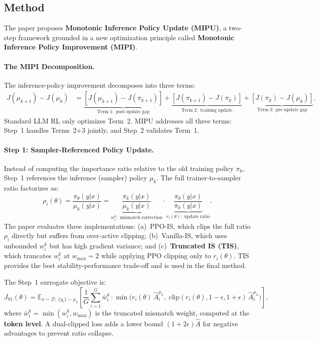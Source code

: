 \documentclass[11pt,a4paper]{article}
\begin{document}
\subsection{Method}

The paper proposes \textbf{Monotonic Inference Policy Update (MIPU)}, a two-step framework grounded in a new optimization principle called \textbf{Monotonic Inference Policy Improvement (MIPI)}.

\paragraph{The MIPI Decomposition.} The inference-policy improvement decomposes into three terms:
\begin{align}
J(\mu_{k+1}) - J(\mu_k) &= \underbrace{[J(\mu_{k+1}) - J(\pi_{k+1})]}_{\mathrm{Term\;1:\;post\text{-}update\;gap}} + \underbrace{[J(\pi_{k+1}) - J(\pi_k)]}_{\mathrm{Term\;2:\;training\;update}} + \underbrace{[J(\pi_k) - J(\mu_k)]}_{\mathrm{Term\;3:\;pre\text{-}update\;gap}}.
\end{align}
Standard LLM RL only optimizes Term~2. MIPU addresses all three terms: Step~1 handles Terms~2+3 jointly, and Step~2 validates Term~1.

\paragraph{Step 1: Sampler-Referenced Policy Update.} Instead of computing the importance ratio relative to the old training policy $\pi_k$, Step~1 references the inference (sampler) policy $\mu_k$. The full trainer-to-sampler ratio factorizes as:
\[
\rho_i(\theta) = \frac{\pi_\theta(y|x)}{\mu_k(y|x)} = \underbrace{\frac{\pi_k(y|x)}{\mu_k(y|x)}}_{w_i^k:\;\mathrm{mismatch\;correction}} \cdot \underbrace{\frac{\pi_\theta(y|x)}{\pi_k(y|x)}}_{r_i(\theta):\;\mathrm{update\;ratio}}.
\]
The paper evaluates three implementations: (a)~PPO-IS, which clips the full ratio $\rho_i$ directly but suffers from over-active clipping; (b)~Vanilla-IS, which uses unbounded $w_i^k$ but has high gradient variance; and (c)~\textbf{Truncated IS (TIS)}, which truncates $w_i^k$ at $w_{\max} = 2$ while applying PPO clipping only to $r_i(\theta)$. TIS provides the best stability-performance trade-off and is used in the final method.

The Step~1 surrogate objective is:
\[
J_{\mathrm{S1}}(\theta) = \mathbb{E}_{x \sim \mathcal{D},\, \{y_i\} \sim \mu_k} \left[ \frac{1}{G} \sum_{i=1}^{G} \bar{w}_i^k \cdot \min\!\big(r_i(\theta)\, \hat{A}_i^{\mu_k},\; \mathrm{clip}(r_i(\theta), 1{-}\epsilon, 1{+}\epsilon)\, \hat{A}_i^{\mu_k}\big) \right],
\]
where $\bar{w}_i^k = \min(w_i^k, w_{\max})$ is the truncated mismatch weight, computed at the \textbf{token level}. A dual-clipped loss adds a lower bound $(1 + 2\epsilon)\hat{A}$ for negative advantages to prevent ratio collapse.
\end{document}
